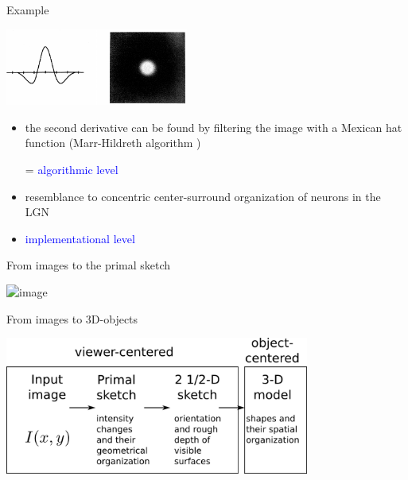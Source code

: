 \documentclass[]{beamer}
\begin{document}
\begin{frame}{Example}
 \begin{center}
\includegraphics[width=60mm]{figs/marr_hildred_mexican_hat.png}
\end{center}
 \begin{itemize}
 \item the second derivative can be found by filtering the image with a Mexican hat function (Marr-Hildreth algorithm )  
\item[=] \textcolor{blue}{algorithmic level}
  
 \item<2-> resemblance to concentric center-surround organization of neurons in the LGN
 \item<2->[=] \textcolor{blue}{implementational level} 
\end{itemize}
\end{frame}


\begin{frame}{From images to the primal sketch}
 \begin{center}
\includegraphics<1>[width=60mm]{figs/marr_primal_sketch.png}
\end{center}
 \end{frame}



\begin{frame}{From images to 3D-objects}
 \begin{center}
\includegraphics[width=100mm]{figs/marr_representations.png}
\end{center}
\end{frame}
\end{document}
